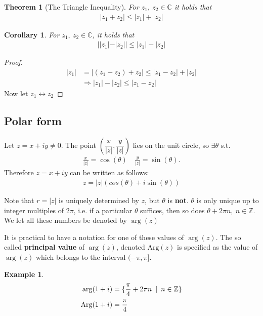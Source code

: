 \documentclass[12pt, a4paper]{article}
\theoremstyle{plain}
\newtheorem{thm}{Theorem} %
\newtheorem{cor}{Corollary}
\theoremstyle{definition}
\newtheorem{example}{Example} %
\begin{document}
			\begin{thm}[The Triangle Inequality]
				For $z_1,\:z_2\in\mathbb{C}$ it holds that
				\begin{align*}
					|z_1+z_2|\le |z_1|+|z_2|
				\end{align*}
			\end{thm}

			\begin{cor}
				For $z_1,\:z_2\in\mathbb{C}$, it holds that
				\begin{align*}
					||z_1|-|z_2||\le |z_1|-|z_2|
				\end{align*}
			\end{cor}

			\begin{proof}
				\begin{align*}
					|z_1| &= |(z_1-z_2)+z_2|\le|z_1-z_2|+|z_2|\\
					&\Rightarrow |z_1|-|z_2|\le|z_1-z_2|
				\end{align*}
				Now let $z_1\longleftrightarrow z_2$
			\end{proof}

			\subsection{Polar form} %
			\label{sub:polar_form}
				Let $z=x+iy\not=0$. The point $\left(\dfrac{x}{|z|},\dfrac{y}{|z|}\right)$ lies on the unit circle, so $\exists\theta$ s.t. 
				\begin{align*}
					\frac{x}{|z|} = \cos(\theta)\quad\frac{y}{|z|} = \sin(\theta).
				\end{align*}
				Therefore $z=x+iy$ can be written as follows:
				\begin{align*}
					z=|z|(cos(\theta)+i\sin(\theta))
				\end{align*}

				Note that $r=|z|$ is uniquely determined by $z$, but $\theta$ is \textbf{not}. $\theta$ is only unique up to integer multiples of $2\pi$, i.e. if a particular $\theta$ suffices, then so does $\theta+2\pi n,\: n\in\mathbb{Z}$. We let all these numbers be denoted by $\arg(z)$

				It is practical to have a notation for one of these values of $\arg(z)$. The so called \textbf{principal value} of $\arg(z)$, denoted $\mathrm{Arg}(z)$ is specified as the value of $\arg(z)$ which belongs to the interval $(-\pi,\pi]$.\\

				\begin{example}
					\begin{align*}
						\arg(1+i) &= \{\frac{\pi}{4}+2\pi n\enskip|\enskip n\in\mathbb{Z}\}\\
						\mathrm{Arg}(1+i) &= \frac{\pi}{4}
					\end{align*}
				\end{example}
\end{document}
